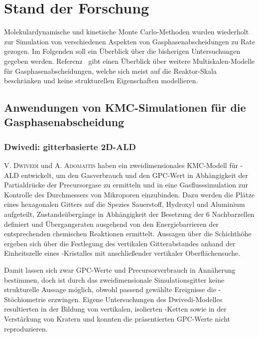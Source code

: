 \section{Stand der Forschung}
\label{present}

Molekulardynamische und kinetische Monte Carlo-Methoden wurden wiederholt zur Simulation von verschiedenen Aspekten von Gasphasenabscheidungen zu Rate gezogen.
Im Folgenden soll ein Überblick über die bisherigen Untersuchungen gegeben werden.
Referenz~\cite{dollet_multiscale_2004} gibt einen Überblick über weitere Multiskalen-Modelle für Gasphasenabscheidungen, welche sich meist auf die Reaktor-Skala beschränken und keine strukturellen Eigenschaften modellieren.

\subsection{Anwendungen von KMC-Simulationen für die Gasphasenabscheidung}

\subsubsection{Dwivedi: gitterbasierte 2D-ALD}

\textsc{V. Dwivedi} und \textsc{A. Adomaitis} haben ein zweidimensionales KMC-Modell für -ALD entwickelt\cite{dwivedi_multiscale_2009,dwivedi_multiscale_2009-1,dwivedi_multiscale_2010}, um den Gasverbrauch und den GPC-Wert in Abhängigkeit der Partialdrücke der Precursorgase zu ermitteln und in eine Gasflusssimulation zur Kontrolle des Durchmessers von Mikroporen einzubinden.
Dazu werden die Plätze eines hexagonalen Gitters auf die Spezies Sauerstoff, Hydroxyl und Aluminium aufgeteilt, Zustandsübergänge in Abhängigkeit der Besetzung der 6 Nachbarzellen definiert und Übergangsraten ausgehend von den Energiebarrieren der entsprechenden chemischen Reaktionen ermittelt.
Aussagen über die Schichthöhe ergeben sich über die Festlegung des vertikalen Gitterabstandes anhand der Einheitszelle eines -Kristalles mit anschließender vertikaler Oberflächensuche.

Damit lassen sich zwar GPC-Werte und Precursorverbrauch in Annäherung bestimmen, doch ist durch das zweidimensionale Simulationsgitter keine strukturelle Aussage möglich, obwohl passend gewählte Ereignisse die -Stöchiometrie erzwingen.
Eigene Untersuchungen des Dwivedi-Modelles resultierten in der Bildung von vertikalen, isolierten -Ketten sowie in der Verstärkung von Kratern und konnten die präsentierten GPC-Werte nicht reproduzieren.

